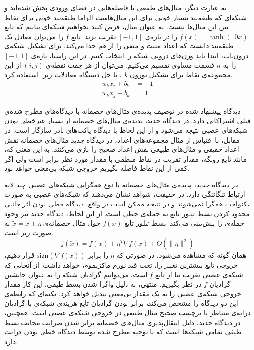 \documentclass[12pt,onecolumn,a4paper]{article}
\begin{document}
به عبارت دیگر، مثال‌های طبیعی با فاصله‌هایی در فضای ورودی پخش شده‌اند و شبکه‌ای که طبقه‌بند بسیار خوبی برای این مثال‌هاست الزاما طبقه‌بند خوبی برای نقاط بین این مثال‌ها نیست. به عنوان مثال، فرض کنید بخواهیم شبکه‌ای بیابیم که تابع 
$f(x)=\tanh(10x)$ 
را در بازه‌ی 
$[-1,1]$
تقریب بزند. تابع 
$f$ 
را می‌توان معادل یک طبقه‌بند دانست که اعداد مثبت و منفی را از هم جدا می‌کند. برای تشکیل شبکه‌ی درون‌یاب، ابتدا باید وزن‌های درونی شبکه را انتخاب کنیم. در این راستا، بازه‌ی 
$[-1,1]$ 
را به 
$n$ 
قسمت مساوی تقسیم می‌کنیم. می‌توان از هر جفت نقطه‌ی 
$(i,j)$
از این مجموعه‌ی نقاط برای تشکیل نورون
$k$
، با حل دستگاه معادلات زیر، استفاده کرد.
\begin{align*}
   w_kx_i+b_k&=-1\\
   w_kx_j+b_k&=1
\end{align*}

دیدگاه پیشنهاد شده در توصیف پدیده‌ی مثال‌های خصمانه با دیدگاه‌های مطرح شده‌ی قبلی اشتراکاتی دارد. در دیدگاه جدید، پدیده‌ی مثال‌های خصمانه از بسیار غیرخطی بودن شبکه‌های عصبی نتیجه می‌شود و از این لحاظ با دیدگاه پاکت‌های نادر سازگار است. در مقابل، با اقتباس از مثال مجموعه‌های اعداد، در دیدگاه جدید مثال‌های خصمانه نقش اعداد حقیقی و مثال‌های طبیعی نقش اعداد صحیح را بازی می‌کنند. به این معنی که، مانند تابع رونگه، مقدار تقریب در نقاط منظمی با مقدار مورد نظر برابر است ولی اگر کمی از این نقاط فاصله بگیریم خروجی شبکه بی‌معنی خواهد بود.

در دیدگاه جدید، پدیده‌ی مثال‌های خصمانه با نوع همگرایی شبکه‌های عصبی چند لایه ارتباط تنگاتنگی دارد. در حقیقت، شواهد نشان می‌دهند که شبکه‌های عصبی به صورت یکنواخت همگرا نمی‌شوند و در نتیجه ممکن است در واقع، دیدگاه خطی بودن اثر جانبی محدود کردن بسط تیلور تابع به جمله‌ی خطی است. از این لحاظ، دیدگاه جدید نیز وجود حمله‌ی
را پیش‌بینی می‌کند. بسط تیلور تابع $f(x)$ حول مثال خصمانه‌ی $\tilde{x}=x+\eta$ به صورت زیر است.
\begin{equation*}
f(\tilde{x})=f(x)+\eta^T\nabla f(x) + O(\|\eta\|^2)
\end{equation*}
همان گونه که مشاهده می‌شود، در صورتی که $\eta$ را برابر $\mathrm{sign}(\nabla f(x))$ قرار دهیم، خروجی تابع بیشترین تغییر را، تحت قید نورم ماکزیموم، خواهد داشت. از آنجایی که شبکه‌ی عصبی تقریب ما از تابع $f$ است، می‌توانیم گرادیان شبکه را به عنوان جانشین گرادیان $f$ در نظر بگیریم. منتهی، به دلیل واگرا شدن بسط طیفی، این کار مقدار خروجی شبکه‌ی عصبی را به یک مقدار بی‌معنی تبدیل خواهد کرد. نکته‌ای که رابطه‌ی این دو دیدگاه را مشخص می‌کند، برابر بودن گرادیان تابع هزینه‌ی شبکه‌ی  با گرادیان درایه‌ی متناظر با برچسب صحیح مثال طبیعی در خروجی شبکه‌ی عصبی است. همچنین، در دیدگاه جدید، دلیل انتقال‌پذیری مثال‌های خصمانه برابر شدن ضرایب مجانب بسط طیفی تمامی شبکه‌ها است که با توجیه مطرح شده توسط دیدگاه خطی بودن قرابت دارد.
\end{document}
